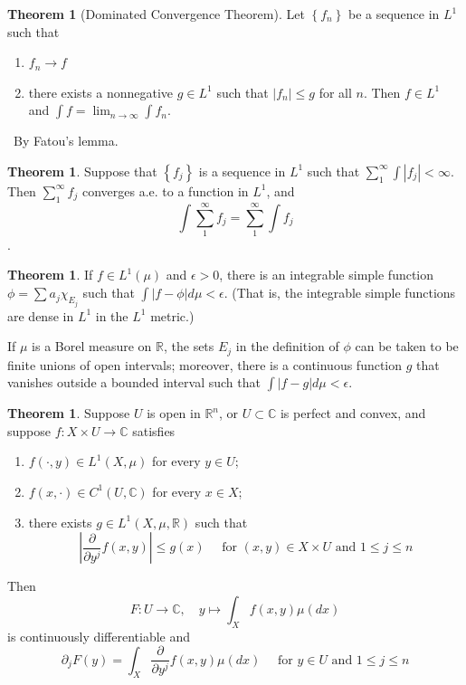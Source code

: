 \documentclass[12pt,a4paper]{book}
\newenvironment{prooff}{{\noindent\it\textcolor{cyan!40!black}{Proof}:}\,}{\par}
\newcommand{\p}{^{\prime}}
\newenvironment{enu}{\begin{enumerate}[(1)]}{\end{enumerate}}
\theoremstyle{definition}
\newtheorem{theo}[defn]{Theorem}
\newtheorem{rema}[defn]{Remark}
\begin{document}
\begin{theo}[Dominated Convergence Theorem]
    Let $\left\{f_n\right\}$ be a sequence in $L^1$ such that 
    \begin{enu} 
    \item  $f_n \rightarrow f$
    \item there exists a nonnegative $g \in L^1$ such that $\left|f_n\right| \leq g$ for all $n$. Then $f \in L^1$ and $\int f=\lim _{n \rightarrow \infty} \int f_n$.
    \end{enu}
\end{theo}
\begin{prooff}
    By Fatou's lemma.
\end{prooff}
\begin{theo}
    Suppose that $\left\{f_j\right\}$ is a sequence in $L^1$ such that $\sum_1^{\infty} \int\left|f_j\right|<\infty$. Then $\sum_1^{\infty} f_j$ converges a.e. to a function in $L^1$, 
    and $$\int \sum_1^{\infty} f_j=\sum_1^{\infty} \int f_j$$.
\end{theo}
\begin{theo}
    If $f \in L^1(\mu)$ and $\epsilon>0$, there is an integrable simple function $\phi=\sum a_j \chi_{E_j}$
    such that $\int|f-\phi| d \mu<\epsilon$. (That is, the integrable simple functions are dense in $L^1$ in the $L^1$ metric.)
    
    If $\mu$ is a Borel measure on $\mathbb{R}$, the sets $E_j$ in the definition of $\phi$ can be taken to be finite unions of open intervals; moreover, there is a continuous function $g$ that vanishes outside a bounded interval such that $\int|f-g| d \mu<\epsilon$.
\end{theo}
\begin{theo} 
Suppose $U$ is open in $\mathbb{R}^n$, or $U \subset \mathbb{C}$ is perfect and convex, and suppose $f: X \times U \rightarrow \mathbb{C}$ satisfies
\begin{enu}
\item $f(\cdot, y) \in L^1(X, \mu)$ for every $y \in U$;
\item $f(x, \cdot) \in C^1(U, \mathbb{C})$ for every $x \in X$;
\item there exists $g \in L^1(X, \mu, \mathbb{R})$ such that
$$
\left|\frac{\partial}{\partial y^j} f(x, y)\right| \leq g(x) \quad \text { for }(x, y) \in X \times U \text { and } 1 \leq j \leq n
$$
\end{enu}
Then
$$
F: U \rightarrow \mathbb{C}, \quad y \mapsto \int_X f(x, y) \mu(d x)
$$
is continuously differentiable and
$$
\partial_j F(y)=\int_X \frac{\partial}{\partial y^j} f(x, y) \mu(d x) \quad \text { for } y \in U \text { and } 1 \leq j \leq n
$$

\end{theo}
\end{document}
